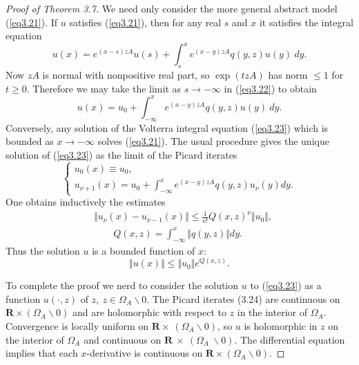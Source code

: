 \documentclass{surv-l}
\theoremstyle{plain}
\theoremstyle{definition}
\numberwithin{equation}{chapter}
\begin{document}
\begin{proof}[Proof of Theorem 3.7]\label{pot3.7}
We need only consider the more general abstract model (\ref{eq3.21}). If $u$ satisfies (\ref{eq3.21}), then for any real $s$ and $x$ it satisfies the integral equation
\begin{equation}\label{eq3.22}
u(x)=e^{(x-s)zA}u(s)+\int_{s}^{x}e^{(x-y)zA}q(y, z)u(y)\ dy.
\end{equation}
Now $zA$ is normal with nonpositive real part, so $\exp(tzA)$ has norm $\leq 1$ for $t\geq 0$. Therefore we may take the limit as $ s\rightarrow-\infty$ in (\ref{eq3.22}) to obtain
\begin{equation}\label{eq3.23}
u(x)=u_{0}+\int_{-\infty}^{x}e^{(x-y)zA}q(y, z)u(y)\ dy.
\end{equation}
Conversely, any solution of the Volterra integral equation (\ref{eq3.23}) which is bounded as $ x\rightarrow-\infty$ solves (\ref{eq3.21}). The usual procedure gives the unique solution of (\ref{eq3.23}) as the limit of the Picard iterates
\begin{equation}\label{3.24}
\left\{\begin{array}{l}
u_{0}(x)\equiv u_{0},\\
u_{\nu+1}(x)=u_{0}+\int_{-\infty}^{x}e^{(x-y)zA}q(y,z)u_{\nu}(y) dy.
\end{array}\right.
\end{equation}
One obtains inductively the estimates
\begin{align}\label{eq3.25}
&\Vert u_{\nu}(x)-u_{\nu-1}(x)\Vert\leq\frac{1}{\nu!}Q(x, z)^{\nu}\Vert u_{0}\Vert,\\ \nonumber
&\qquad Q(x, z)=\int_{-\infty}^{x}\Vert q(y, z)\Vert dy.
\end{align}
Thus the solution $u$ is a bounded function of $x$:
\begin{equation}\label{eq3.26}
\Vert u(x)\Vert\leq\Vert u_{0}\Vert e^{Q(x,z)}.
\end{equation}

To complete the proof we nerd to consider the solution $u$ to (\ref{eq3.23}) as a function $u(\cdot, z)$ of $z,\ z\in\Omega_{A}\backslash 0$. The Picard iterates (3.24) are continuous on $\mathbf{R}\times(\Omega_{A}\backslash 0)$ and are holomorphic with respect to $z$ in the interior of $\Omega_{A}$. Convergence is locally uniform on $\mathbf{R} \times\ (\Omega_{A}\backslash 0)$, so $u$ is holomorphic in $z$ on the interior of $\Omega_{A}$ and continuous on $\mathbf{R}\ \times\ (\Omega_{A}\ \backslash 0)$. The differential equation implies that each $x$-derivative is continuous on $\mathbf{R}\times(\Omega_{A}\backslash 0)$.


\end{proof}
\end{document}
